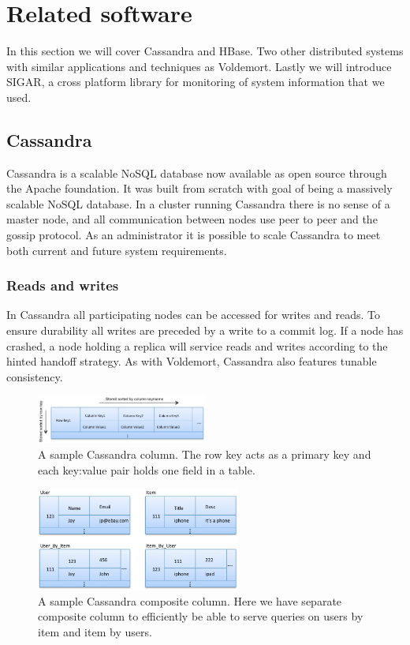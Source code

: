 \section{Related software}
\label{sec:related_software}
In this section we will cover Cassandra and HBase. Two other distributed systems with similar applications and techniques as Voldemort. Lastly we will introduce SIGAR, a cross platform library for monitoring of system information that we used.

\subsection{Cassandra}
Cassandra is a scalable NoSQL database now available as open source through the Apache foundation. It was built from scratch with goal of being a massively scalable NoSQL database. In a cluster running Cassandra there is no sense of a master node, and all communication between nodes use peer to peer and the gossip protocol. As an administrator it is possible to scale Cassandra to meet both current and future system requirements. 

\subsubsection{Reads and writes}
In Cassandra all participating nodes can be accessed for writes and reads. To ensure durability all writes are preceded by a write to a commit log. If a node has crashed, a node holding a replica will service reads and writes according to the hinted handoff strategy. As with Voldemort, Cassandra also features tunable consistency. 

\begin{figure}[h]
    \centering
    \includegraphics[width=0.5\textwidth]{background/figures/cas_col.png}
    \caption{A sample Cassandra column\protect\footnotemark. The row key acts as a primary key and each key:value pair holds one field in a table.}
    \label{fig:sample_col}
\end{figure}

\begin{figure}[h]
    \centering
    \includegraphics[width=0.6\textwidth]{background/figures/cas_comp_col.png}
    \caption{A sample Cassandra composite column. Here we have separate composite column to efficiently be able to serve queries on users by item and item by users.}
    \label{fig:sample_comp_col}
\end{figure}

